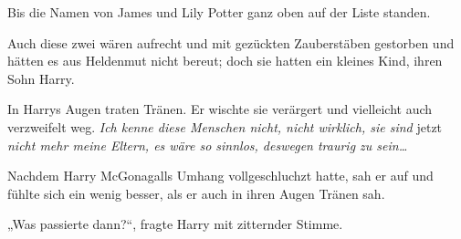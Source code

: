 Bis die Namen von James und Lily Potter ganz oben auf der Liste standen.

Auch diese zwei wären aufrecht und mit gezückten Zauberstäben gestorben und hätten es aus Heldenmut nicht bereut; doch sie hatten ein kleines Kind, ihren Sohn Harry.

In Harrys Augen traten Tränen. Er wischte sie verärgert und vielleicht auch verzweifelt weg. \emph{Ich kenne diese Menschen nicht, nicht wirklich, sie sind} jetzt \emph{nicht mehr meine Eltern, es wäre so sinnlos, deswegen traurig zu sein…}

Nachdem Harry McGonagalls Umhang vollgeschluchzt hatte, sah er auf und fühlte sich ein wenig besser, als er auch in ihren Augen Tränen sah.

„Was passierte dann?“, fragte Harry mit zitternder Stimme.

